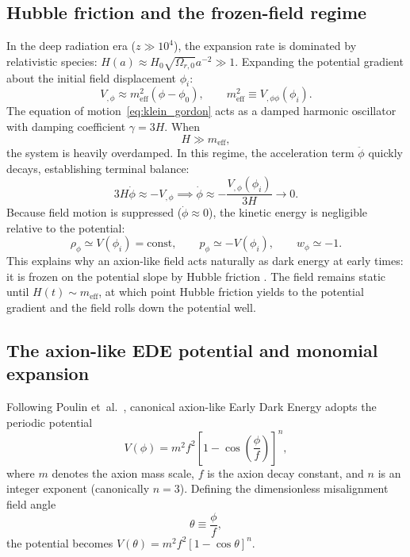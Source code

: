 \documentclass[11pt]{article}
\begin{document}
\subsection{Hubble friction and the frozen-field regime}
In the deep radiation era ($z \gg 10^4$), the expansion rate is dominated by relativistic species: $H(a) \approx H_0\sqrt{\Omega_{r,0}}a^{-2} \gg 1$. Expanding the potential gradient about the initial field displacement $\phi_i$:
\begin{equation}
V_{,\phi} \approx m_{\mathrm{eff}}^2 (\phi - \phi_0), \qquad m_{\mathrm{eff}}^2 \equiv V_{,\phi\phi}(\phi_i).
\end{equation}
The equation of motion~\eqref{eq:klein_gordon} acts as a damped harmonic oscillator with damping coefficient $\gamma = 3H$. When
\begin{equation}
H \gg m_{\mathrm{eff}},
\end{equation}
the system is heavily overdamped. In this regime, the acceleration term $\ddot\phi$ quickly decays, establishing terminal balance:
\begin{equation}
3H\dot\phi \approx -V_{,\phi} \implies \dot\phi \approx -\frac{V_{,\phi}(\phi_i)}{3H} \to 0.
\end{equation}
Because field motion is suppressed ($\dot\phi \approx 0$), the kinetic energy is negligible relative to the potential:
\begin{equation}
\rho_\phi \simeq V(\phi_i) = \mathrm{const}, \qquad p_\phi \simeq -V(\phi_i), \qquad w_\phi \simeq -1.
\end{equation}
This explains why an axion-like field acts naturally as dark energy at early times: it is frozen on the potential slope by Hubble friction \cite{poulin2018ula,smith2020oscillating}. The field remains static until $H(t) \sim m_{\mathrm{eff}}$, at which point Hubble friction yields to the potential gradient and the field rolls down the potential well.

\subsection{The axion-like EDE potential and monomial expansion}
Following Poulin et~al.~\cite{poulin2018ula,poulin2019ede}, canonical axion-like Early Dark Energy adopts the periodic potential
\begin{equation}
\boxed{V(\phi) = m^2f^2\left[ 1 - \cos\left(\frac{\phi}{f}\right) \right]^n},
\label{eq:axion_potential}
\end{equation}
where $m$ denotes the axion mass scale, $f$ is the axion decay constant, and $n$ is an integer exponent (canonically $n=3$). Defining the dimensionless misalignment field angle
\begin{equation}
\theta \equiv \frac{\phi}{f},
\end{equation}
the potential becomes $V(\theta) = m^2f^2[1 - \cos\theta]^n$. 
\end{document}
